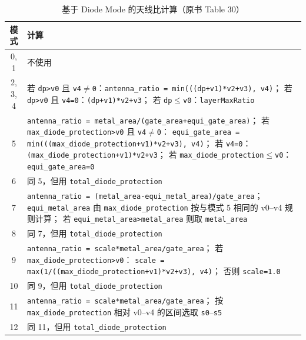 \begin{table}[htbp]
\centering
\caption{基于 Diode Mode 的天线比计算（原书 Table 30）}
\label{tab:antenna-ratio-calc}
\small
\begin{tabularx}{\textwidth}{@{}c >{\raggedright\arraybackslash}X@{}}
\toprule
模式 & 计算 \\
\midrule
0, 1 & 不使用 \\
2, 3, 4 &
若 \texttt{dp>v0} 且 \texttt{v4$\neq$0}：\texttt{antenna\_ratio = min(((dp+v1)*v2+v3), v4)}；\newline
若 \texttt{dp>v0} 且 \texttt{v4=0}：\texttt{(dp+v1)*v2+v3}；\newline
若 \texttt{dp$\leq$v0}：\texttt{layerMaxRatio} \\
5 & \texttt{antenna\_ratio = metal\_area/(gate\_area+equi\_gate\_area)}；\newline
若 \texttt{max\_diode\_protection>v0} 且 \texttt{v4$\neq$0}：
\texttt{equi\_gate\_area = min(((max\_diode\_protection+v1)*v2+v3), v4)}；\newline
若 \texttt{v4=0}：\texttt{(max\_diode\_protection+v1)*v2+v3}；\newline
若 \texttt{max\_diode\_protection$\leq$v0}：\texttt{equi\_gate\_area=0} \\
6 & 同 5，但用 \texttt{total\_diode\_protection} \\
7 & \texttt{antenna\_ratio = (metal\_area-equi\_metal\_area)/gate\_area}；\newline
\texttt{equi\_metal\_area} 由 \texttt{max\_diode\_protection} 按与模式 5 相同的 v0--v4 规则计算；\newline
若 \texttt{equi\_metal\_area>metal\_area} 则取 \texttt{metal\_area} \\
8 & 同 7，但用 \texttt{total\_diode\_protection} \\
9 & \texttt{antenna\_ratio = scale*metal\_area/gate\_area}；\newline
若 \texttt{max\_diode\_protection>v0}：
\texttt{scale = max(1/((max\_diode\_protection+v1)*v2+v3), v4)}；\newline
否则 \texttt{scale=1.0} \\
10 & 同 9，但用 \texttt{total\_diode\_protection} \\
11 & \texttt{antenna\_ratio = scale*metal\_area/gate\_area}；\newline
按 \texttt{max\_diode\_protection} 相对 v0--v4 的区间选取 \texttt{s0}--\texttt{s5} \\
12 & 同 11，但用 \texttt{total\_diode\_protection} \\

\end{tabularx}
\end{table}
